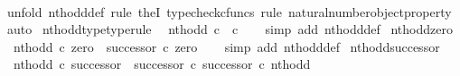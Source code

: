 \begin{isabellebody}
%
\isadelimproof
\ \ %
\endisadelimproof
%
\isatagproof
{}\isamarkupfalse%
\ {\isacharparenleft}{\kern0pt}unfold\ nth{\isacharunderscore}{\kern0pt}odd{\isacharunderscore}{\kern0pt}def{\isacharcomma}{\kern0pt}\ rule\ theI{\isacharprime}{\kern0pt}{\isacharcomma}{\kern0pt}\ typecheck{\isacharunderscore}{\kern0pt}cfuncs{\isacharcomma}{\kern0pt}\ rule\ natural{\isacharunderscore}{\kern0pt}number{\isacharunderscore}{\kern0pt}object{\isacharunderscore}{\kern0pt}property{}{\isacharcomma}{\kern0pt}\ auto{\isacharparenright}{\kern0pt}%
\endisatagproof
{\isafoldproof}%
%
\isadelimproof
\isanewline
%
\endisadelimproof
\isanewline
{}\isamarkupfalse%
\ nth{\isacharunderscore}{\kern0pt}odd{\isacharunderscore}{\kern0pt}type{\isacharbrackleft}{\kern0pt}type{\isacharunderscore}{\kern0pt}rule{\isacharbrackright}{\kern0pt}{\isacharcolon}{\kern0pt}\isanewline
\ \ {\isachardoublequoteopen}nth{\isacharunderscore}{\kern0pt}odd{\isacharcolon}{\kern0pt}\ {\isasymnat}\isactrlsub c\ {\isasymrightarrow}\ {\isasymnat}\isactrlsub c{\isachardoublequoteclose}\isanewline
%
\isadelimproof
\ \ %
\endisadelimproof
%
\isatagproof
{}\isamarkupfalse%
\ {\isacharparenleft}{\kern0pt}simp\ add{\isacharcolon}{\kern0pt}\ nth{\isacharunderscore}{\kern0pt}odd{\isacharunderscore}{\kern0pt}def{}{\isacharparenright}{\kern0pt}%
\endisatagproof
{\isafoldproof}%
%
\isadelimproof
\isanewline
%
\endisadelimproof
\isanewline
{}\isamarkupfalse%
\ nth{\isacharunderscore}{\kern0pt}odd{\isacharunderscore}{\kern0pt}zero{\isacharcolon}{\kern0pt}\isanewline
\ \ {\isachardoublequoteopen}nth{\isacharunderscore}{\kern0pt}odd\ {\isasymcirc}\isactrlsub c\ zero\ {\isacharequal}{\kern0pt}\ successor\ {\isasymcirc}\isactrlsub c\ zero{\isachardoublequoteclose}\isanewline
%
\isadelimproof
\ \ %
\endisadelimproof
%
\isatagproof
{}\isamarkupfalse%
\ {\isacharparenleft}{\kern0pt}simp\ add{\isacharcolon}{\kern0pt}\ nth{\isacharunderscore}{\kern0pt}odd{\isacharunderscore}{\kern0pt}def{}{\isacharparenright}{\kern0pt}%
\endisatagproof
{\isafoldproof}%
%
\isadelimproof
\isanewline
%
\endisadelimproof
\isanewline
{}\isamarkupfalse%
\ nth{\isacharunderscore}{\kern0pt}odd{\isacharunderscore}{\kern0pt}successor{\isacharcolon}{\kern0pt}\isanewline
\ \ {\isachardoublequoteopen}nth{\isacharunderscore}{\kern0pt}odd\ {\isasymcirc}\isactrlsub c\ successor\ {\isacharequal}{\kern0pt}\ {\isacharparenleft}{\kern0pt}successor\ {\isasymcirc}\isactrlsub c\ successor{\isacharparenright}{\kern0pt}\ {\isasymcirc}\isactrlsub c\ nth{\isacharunderscore}{\kern0pt}odd{\isachardoublequoteclose}\isanewline

\end{isabellebody}
